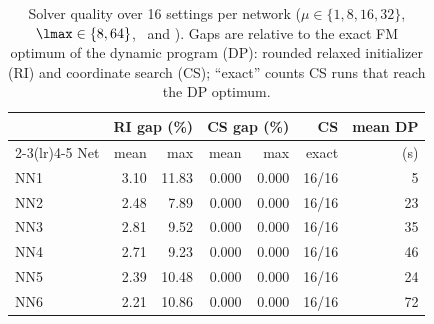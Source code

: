 \begin{table}[t]
\centering
\caption{Solver quality over 16 settings per network ($\mu\in\{1,8,16,32\}$, $\lmax\in\{8,64\}$, \Rc\ and \Tc). Gaps are relative to the exact FM optimum of the dynamic program (DP): rounded relaxed initializer (RI) and coordinate search (CS); ``exact'' counts CS runs that reach the DP optimum.}
\label{tab:solver}
\small
\setlength{\tabcolsep}{3pt}
\begin{tabular}{@{}lrrrrrr@{}}
\toprule
 & \multicolumn{2}{c}{RI gap (\%)} & \multicolumn{2}{c}{CS gap (\%)} & CS & mean DP\\
\cmidrule(lr){2-3}\cmidrule(lr){4-5}
Net & mean & max & mean & max & exact & (s)\\
\midrule
NN1 & 3.10 & 11.83 & 0.000 & 0.000 & 16/16 & 5\\
NN2 & 2.48 & 7.89 & 0.000 & 0.000 & 16/16 & 23\\
NN3 & 2.81 & 9.52 & 0.000 & 0.000 & 16/16 & 35\\
NN4 & 2.71 & 9.23 & 0.000 & 0.000 & 16/16 & 46\\
NN5 & 2.39 & 10.48 & 0.000 & 0.000 & 16/16 & 24\\
NN6 & 2.21 & 10.86 & 0.000 & 0.000 & 16/16 & 72\\
\bottomrule
\end{tabular}
\end{table}